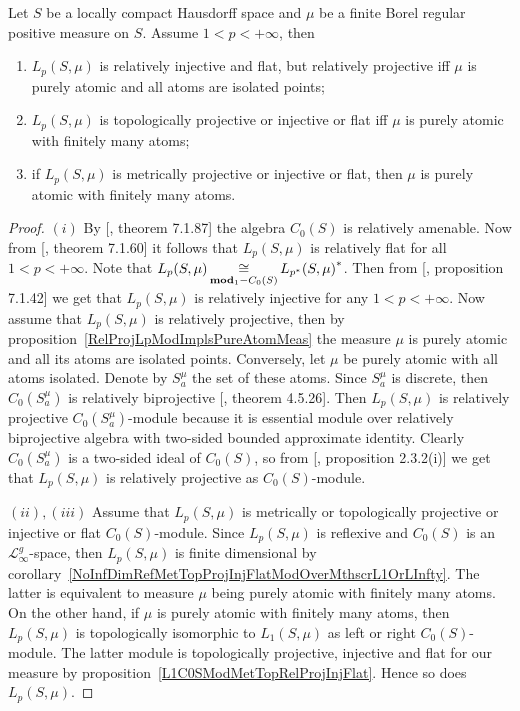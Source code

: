\begin{proposition}\label{LpC0SModMetTopRelProjIngFlat} Let $S$ be a locally
compact Hausdorff space and $\mu$ be a finite Borel regular positive measure on
$S$. Assume $1<p<+\infty$, then 

\begin{enumerate}[label = (\roman*)]
    \item $L_p(S,\mu)$ is relatively injective and flat, but relatively 
    projective iff $\mu$ is purely atomic and all atoms are isolated points;

    \item $L_p(S,\mu)$ is topologically projective or injective or flat 
    iff $\mu$ is purely atomic with finitely many atoms;

    \item if $L_p(S,\mu)$ is metrically projective or injective or flat, 
    then $\mu$ is purely atomic with finitely many atoms.
\end{enumerate}
\end{proposition}
\begin{proof} $(i)$ By [\cite{HelBanLocConvAlg}, theorem 7.1.87] the algebra
$C_0(S)$ is relatively amenable. Now from [\cite{HelBanLocConvAlg}, theorem
7.1.60] it follows that $L_p(S,\mu)$ is relatively flat for all $1<p<+\infty$.
Note that $L_p(S,\mu)\mathop{\mathbin{\cong}}\limits_{\mathbf{mod}_1-C_0(S)}{L_{p^*}(S,\mu)}^*$. Then from
[\cite{HelBanLocConvAlg}, proposition 7.1.42] we get that $L_p(S,\mu)$ is
relatively injective for any $1<p<+\infty$. Now assume that $L_p(S,\mu)$ is
relatively projective, then by proposition~\ref{RelProjLpModImplsPureAtomMeas}
the measure $\mu$ is purely atomic and all its atoms are isolated points.
Conversely, let $\mu$ be purely atomic with all atoms isolated. Denote by
$S_a^{\mu}$ the set of these atoms. Since $S_a^{\mu}$ is discrete, then
$C_0(S_a^{\mu})$ is relatively biprojective [\cite{HelHomolBanTopAlg}, theorem
4.5.26]. Then $L_p(S,\mu)$ is relatively projective $C_0(S_a^{\mu})$-module
because it is essential module over relatively biprojective algebra with
two-sided bounded approximate identity. Clearly $C_0(S_a^{\mu})$ is a two-sided
ideal of $C_0(S)$, so from [\cite{RamsHomPropSemgroupAlg}, proposition 2.3.2(i)]
we get that $L_p(S,\mu)$ is relatively projective as $C_0(S)$-module.

$(ii), (iii)$ Assume that $L_p(S,\mu)$ is metrically or topologically projective
or injective or flat $C_0(S)$-module. Since $L_p(S,\mu)$ is reflexive and
$C_0(S)$ is an $\mathscr{L}_\infty^g$-space, then $L_p(S,\mu)$ is finite
dimensional by
corollary~\ref{NoInfDimRefMetTopProjInjFlatModOverMthscrL1OrLInfty}. The latter
is equivalent to measure $\mu$ being purely atomic with finitely many atoms. On
the other hand, if $\mu$ is purely atomic with finitely many atoms, then
$L_p(S,\mu)$ is topologically isomorphic to $L_1(S,\mu)$ as left or right
$C_0(S)$-module. The latter module is topologically projective, injective and
flat for our measure by proposition~\ref{L1C0SModMetTopRelProjInjFlat}. Hence so
does $L_p(S,\mu)$.
\end{proof}

